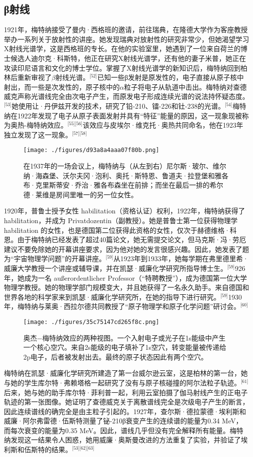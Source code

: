 \subsection{β射线}
1921年，梅特纳接受了曼内·西格班的邀请，前往瑞典，在隆德大学作为客座教授举办一系列关于放射性的讲座。她发现瑞典对放射性的研究非常少，但她渴望学习X射线光谱学，这是西格班的专长。在他的实验室里，她遇到了一位来自荷兰的博士候选人迪尔克·科斯特，他正在研究X射线光谱学，还有他的妻子米普，她正在攻读印尼语言和文化的博士学位。掌握了X射线光谱学的新知识后，梅特纳回到柏林后重新审视了$\beta$射线光谱。\(^\text{[52]}\)已知一些β发射是原发性的，电子直接从原子核中射出，而一些是次发性的，原子核中的$\alpha$粒子将电子从轨道中击出。梅特纳对查德威克声称光谱线完全由次电子产生，而原发电子形成连续光谱的说法持怀疑态度。\(^\text{[53]}\)她使用让·丹伊兹开发的技术，研究了铅-210、镭-226和钍-238的光谱。\(^\text{[54]}\)梅特纳在1922年发现了电子从原子表面发射并具有“特征”能量的原因，这一现象现被称为奥热-梅特纳效应。\(^\text{[55][56]}\)该效应与皮埃尔·维克托·奥热共同命名，他在1923年独立发现了这一现象。\(^\text{[57][58]}\)
\begin{figure}[ht]
\centering
\texttt{[image: ./figures/d93a8a4aaa07f80b.png]}
\caption{在1937年的一场会议上，梅特纳与（从左到右）尼尔斯·玻尔、维尔纳·海森堡、沃尔夫冈·泡利、奥托·斯特恩、鲁道夫·拉登堡和雅各布·克里斯蒂安·乔治·雅各布森坐在前排；而坐在最后一排的希尔德·莱维是房间里唯一的另一位女性。} \label{fig_LZm_7}
\end{figure}
1920年，普鲁士授予女性 habilitation（资格认证）权利，1922年，梅特纳获得了 habilitation，并成为 Privatdozentin（副教授）。她是普鲁士第一位获得物理学 habilitation 的女性，也是德国第二位获得此资格的女性，仅次于赫德维格·科恩。由于梅特纳已经发表了超过40篇论文，她无需提交论文，但马克斯·冯·劳厄建议不要免除她的开幕讲座要求，因为他对她的发言很感兴趣。因此，她发表了题为“宇宙物理学问题”的开幕讲座。\(^\text{[59]}\)从1923年到1933年，她每学期在弗里德里希·威廉大学教授一个讲座或辅导课，并在凯瑟·威廉化学研究所指导博士生。\(^\text{[59]}\)926年，她成为一名 außerordentlicher Professor（“特聘教授”），成为德国第一位大学物理学教授。她的物理学部门规模变大，并且她获得了一名永久助手。来自德国和世界各地的科学家来到凯瑟·威廉化学研究所，在她的指导下进行研究。\(^\text{[59]}\)1930年，梅特纳与莱奥·西拉尔德共同教授了“原子物理学和原子化学问题”研讨会。\(^\text{[60]}\)
\begin{figure}[ht]
\centering
\texttt{[image: ./figures/35c75147cd265f8c.png]}
\caption{奥杰−梅特纳效应的两种视图。一个入射电子或光子在1s能级中产生一个核心空穴。来自2s能级的电子填补了1s空穴，转变能量被传递给2p电子，后者被发射出去。最终的原子状态因此有两个空穴。} \label{fig_LZm_8}
\end{figure}
梅特纳在凯瑟·威廉化学研究所建造了第一台威尔逊云室，这是柏林的第一台，她与她的学生库尔特·弗赖塔格一起研究了没有与原子核碰撞的阿尔法粒子轨迹。\(^\text{[61]}\)后来，她与她的助手库尔特·菲利普一起，利用云室拍摄了伽马射线产生的正电子轨迹的第一张图像。她证明了查德威克关于离散谱线完全是次级电子产生的断言，因此连续谱线的确完全是由主粒子引起的。1927年，查尔斯·德拉蒙德·埃利斯和威廉·阿尔弗雷德·伍斯特测量了铋-210β衰变产生的连续谱的能量为0.34 MeV，而每次衰变的能量为0.35 MeV。因此，谱线几乎但没有完全解释所有能量。梅特纳发现这一结果令人困惑，她用威廉·奥斯曼改进的方法重复了实验，并验证了埃利斯和伍斯特的结果。\(^\text{[53][62][63]}\)

